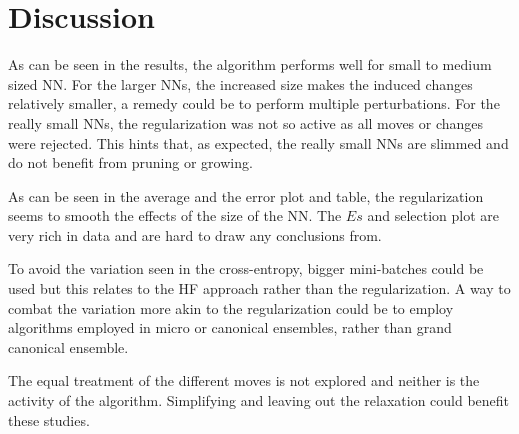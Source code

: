 \chapter{Discussion}

As can be seen in the results, the algorithm performs well for small to medium sized NN. For the larger NNs, the increased size makes the induced changes relatively smaller, a remedy could be to perform multiple perturbations. For the really small NNs, the regularization was not so active as all moves or changes were rejected. This hints that, as expected, the really small NNs are slimmed and do not benefit from pruning or growing. 

As can be seen in the average and the error plot and table, the regularization seems to smooth the effects of the size of the NN. The $Es$ and selection plot are very rich in data and are hard to draw any conclusions from. 

To avoid the variation seen in the cross-entropy, bigger mini-batches could be used but this relates to the HF approach rather than the regularization. A way to combat the variation more akin to the regularization could be to employ algorithms employed in micro or canonical ensembles, rather than grand canonical ensemble.

The equal treatment of the different moves is not explored and neither is the activity of the algorithm. Simplifying and leaving out the relaxation could benefit these studies. 